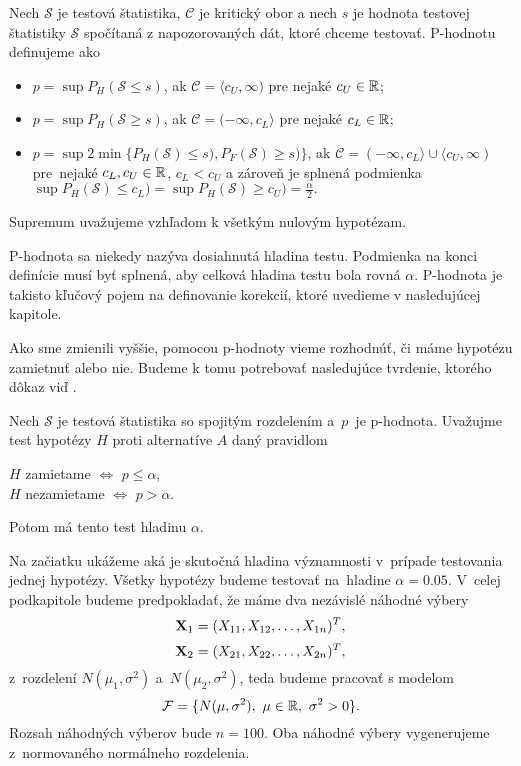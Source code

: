 \begin{definicia}\label{def4}
  Nech $\mathcal{S}$ je testová štatistika, $\mathcal{C}$ je kritický obor a nech $s$ je hodnota testovej štatistiky $\mathcal{S}$ 
  spočítaná z napozorovaných dát, ktoré chceme testovať. 
  \mbox{P-hodnotu} definujeme ako 
  \begin{itemize} 
    \item $ p = \sup P_H (\mathcal{S} \leq s) $, 
    ak $\mathcal{C} = \langle c_U, \infty)$ pre nejaké $c_U \in \mathbb{R}$;
    \item $ p = \sup P_H (\mathcal{S} \geq s) $, 
    ak $\mathcal{C} = (-\infty, c_L \rangle$ pre nejaké $c_L \in \mathbb{R}$;
    \item $ p = \sup 2 \min \{P_H (\mathcal{S}) \leq s), P_F (\mathcal{S}) \geq s)\} $, 
    ak $\mathcal{C} = (-\infty, c_L \rangle \cup \langle c_U, \infty)$  
    pre~nejaké $c_L, c_U \in \mathbb{R}$, $c_L < c_U$ a zároveň je splnená podmienka 
    \newline $ \sup P_H (\mathcal{S}) \leq c_L) 
    = \sup P_H (\mathcal{S}) \geq c_U) = \frac{\alpha}{2}. $
  \end{itemize}
  Supremum uvažujeme vzhľadom k všetkým nulovým hypotézam. 
\end{definicia}  

P-hodnota sa niekedy nazýva dosiahnutá hladina testu. 
Podmienka na konci definície musí byť splnená, aby celková hladina testu bola rovná $\alpha$. 
P-hodnota je takisto kľučový pojem na definovanie korekcií, ktoré uvedieme v nasledujúcej kapitole. 

Ako sme zmienili vyššie, pomocou p-hodnoty vieme rozhodnúť, či máme hypotézu zamietnuť alebo nie. 
Budeme k tomu potrebovať nasledujúce tvrdenie, ktorého dôkaz viď \cite[Tvrdenie 4.1]{Omelka19}. 

\begin{tvrd}\label{tvrd01}
  Nech $\mathcal{S}$ je testová štatistika so spojitým rozdelením 
  a~$p$~je p-hodnota. 
  Uvažujme test hypotézy $H$ proti alternatíve $A$ daný pravidlom 
  \begin{center}
    $H$ zamietame $\Longleftrightarrow$ $p \leq \alpha$, \\
    $H$ nezamietame $\Longleftrightarrow$ $p > \alpha$.\\
  \end{center}  
  Potom má tento test hladinu $\alpha$. 
\end{tvrd}  

Na začiatku ukážeme aká je skutočná hladina významnosti v~prípade testovania jednej hypotézy. 
Všetky hypotézy budeme testovať na~hladine $\alpha = 0.05$. 
V~celej podkapitole budeme predpokladať, že máme dva nezávislé náhodné výbery
$$ {\bf X}_1 = (X_{11}, X_{12}, \dots, X_{1n})^T, $$ 
$$ {\bf X}_2 = (X_{21}, X_{22}, \dots, X_{2n})^T, $$
z~rozdelení $N(\mu_1, \sigma^2)$ a~$N(\mu_2, \sigma^2)$, 
teda budeme pracovať s modelom 
$$ \mathcal{F} = \{ N(\mu, \sigma^2),~\mu \in \mathbb{R},~\sigma^2>0 \}. $$ 
Rozsah náhodných výberov bude $n=100$. 
Oba náhodné výbery vygenerujeme z~normovaného normálneho rozdelenia. 

